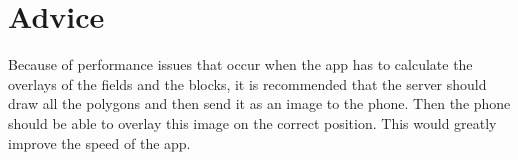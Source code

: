 \section{Advice}
Because of performance issues that occur when the app has to calculate the overlays of the fields and the blocks, it is recommended that the server should draw all the polygons and then send it as an image to the phone. Then the phone should be able to overlay this image on the correct position. This would greatly improve the speed of the app.

